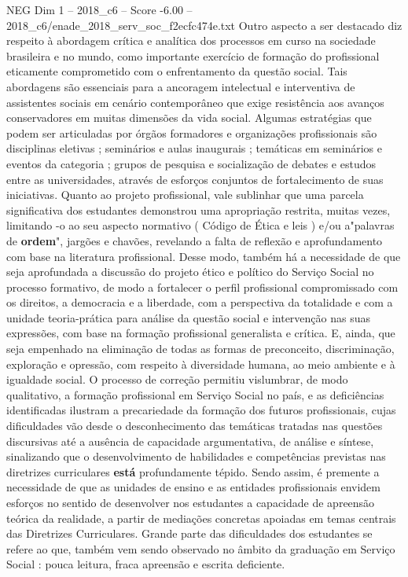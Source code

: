 \begin{textsample}{NEG Dim 1 – 2018\_c6 – Score -6.00 – 2018\_c6/enade\_2018\_serv\_soc\_f2ecfc474e.txt}
Outro aspecto a ser destacado diz respeito à abordagem crítica e analítica dos processos em curso na sociedade brasileira e no mundo, como importante exercício de formação do profissional eticamente comprometido com o enfrentamento da questão social.
Tais abordagens são essenciais para a ancoragem intelectual e interventiva de assistentes sociais em cenário contemporâneo que exige resistência aos avanços conservadores em muitas dimensões da vida social.
Algumas estratégias que podem ser articuladas por órgãos formadores e organizações profissionais são disciplinas eletivas ; seminários e aulas inaugurais ; temáticas em seminários e eventos da categoria ; grupos de pesquisa e socialização de debates e estudos entre as universidades, através de esforços conjuntos de fortalecimento de suas iniciativas.
Quanto ao projeto profissional, vale sublinhar que uma parcela significativa dos estudantes demonstrou uma apropriação restrita, muitas vezes, limitando -o ao seu aspecto normativo ( Código de Ética e leis ) e/ou a"palavras de \textbf{ordem}", jargões e chavões, revelando a falta de reflexão e aprofundamento com base na literatura profissional.
Desse modo, também há a necessidade de que seja aprofundada a discussão do projeto ético e político do Serviço Social no processo formativo, de modo a fortalecer o perfil profissional compromissado com os direitos, a democracia e a liberdade, com a perspectiva da totalidade e com a unidade teoria-prática para análise da questão social e intervenção nas suas expressões, com base na formação profissional generalista e crítica.
E, ainda, que seja empenhado na eliminação de todas as formas de preconceito, discriminação, exploração e opressão, com respeito à diversidade humana, ao meio ambiente e à igualdade social.
O processo de correção permitiu vislumbrar, de modo qualitativo, a formação profissional em Serviço Social no país, e as deficiências identificadas ilustram a precariedade da formação dos futuros profissionais, cujas dificuldades vão desde o desconhecimento das temáticas tratadas nas questões discursivas até a ausência de capacidade argumentativa, de análise e síntese, sinalizando que o desenvolvimento de habilidades e competências previstas nas diretrizes curriculares \textbf{está} profundamente tépido.
Sendo assim, é premente a necessidade de que as unidades de ensino e as entidades profissionais envidem esforços no sentido de desenvolver nos estudantes a capacidade de apreensão teórica da realidade, a partir de mediações concretas apoiadas em temas centrais das Diretrizes Curriculares.
Grande parte das dificuldades dos estudantes se refere ao que, também vem sendo observado no âmbito da graduação em Serviço Social : pouca leitura, fraca apreensão e escrita deficiente.

\end{textsample}
